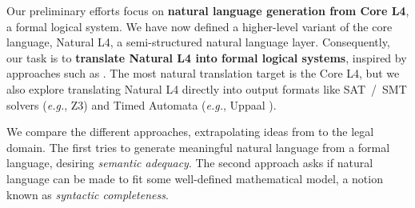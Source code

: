 \documentclass[runningheads]{llncs}
\begin{document}
Our preliminary efforts \cite{listenmaa-etal-2021-towards} %
focus on \textbf{natural language generation from Core L4}, a formal logical system.
We have now defined a higher-level variant of the core language, Natural L4, a semi-structured natural language layer.
Consequently, our task is to \textbf{translate Natural L4 into formal logical systems},
inspired by approaches such as \cite{vanEijck2010computationalSemantics,schaefer_kohlhase_glif_2020}.
The most natural translation target is the Core L4, but we also explore translating Natural L4 directly into output formats like 
SAT~/~SMT solvers (\emph{e.g.}, Z3\cite{demoura_bjorner_z3_2008}) and Timed Automata (\emph{e.g.}, Uppaal \cite{larsen1997uppaal}).

We compare the different approaches, extrapolating ideas from \cite{macmillan2021} to the legal domain. The first tries to generate meaningful natural language from a formal language, desiring \emph{semantic adequacy}. The second approach asks if natural language can be made to fit some well-defined mathematical model, a notion known as \emph{syntactic completeness}.



%
%
%
% 


\end{document}
